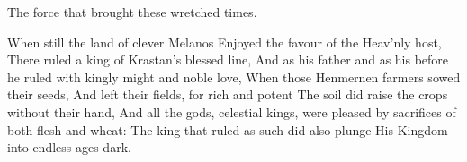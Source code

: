 \documentclass[a4paper,12pt]{article}
\newcommand{\vel}{\verseline}
\begin{document}
\begin{poem}
\begin{stanza}
The force that brought these wretched times.
\end{stanza}
\begin{stanza}
When still the land of clever Melanos\vel
Enjoyed the favour of the Heav'nly host,\vel
There ruled a king of Krastan's blessed line,\vel
And as his father and as his before\vel
he ruled with kingly might and noble love,\vel
When those Henmernen farmers sowed their seeds,\vel
And left their fields, for rich and potent\vel
The soil did raise the crops without their hand,\vel
And all the gods, celestial kings, were pleased\vel
by sacrifices of both flesh and wheat:\vel
The king that ruled as such did also plunge\vel
His Kingdom into endless ages dark. 
\end{stanza}
\end{poem}
\end{document}
